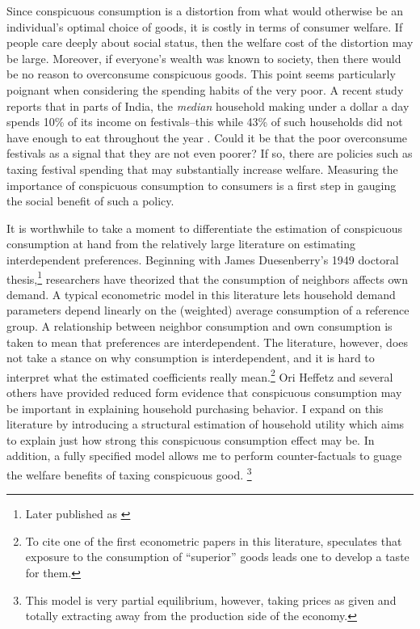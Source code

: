 \documentclass{article}
\begin{document}
Since conspicuous consumption is a distortion from what would otherwise be an individual's optimal choice of goods, it is costly in terms of consumer welfare.  If people care deeply about social status, then the welfare cost of the distortion may be large.  Moreover, if everyone's wealth was known to society, then there would be no reason to overconsume conspicuous goods.  This point seems particularly poignant when considering the spending habits of the very poor.  A recent study reports that in parts of India, the \emph{median} household making under a dollar a day spends 10\% of its income on festivals--this while 43\% of such households did not have enough to eat throughout the year \citep{BanerjeeDuflo2007}.  Could it be that the poor overconsume festivals as a signal that they are not even poorer?  If so, there are policies such as taxing festival spending that may substantially increase welfare.  Measuring the importance of conspicuous consumption to consumers is a first step in gauging the social benefit of such a policy.

It is worthwhile to take a moment to differentiate the estimation of conspicuous consumption at hand from the relatively large literature on estimating interdependent preferences.  Beginning with James Duesenberry's 1949 doctoral thesis,\footnote{Later published as \citep{Duesenberry1949}} researchers have theorized that the consumption of neighbors affects own demand.  A typical econometric model in this literature lets household demand parameters depend linearly on the (weighted) average consumption of a reference group. A relationship between neighbor consumption and own consumption is taken to mean that preferences are interdependent.  The literature, however, does not take a stance on why consumption is interdependent, and it is hard to interpret what the estimated coefficients really mean.\footnote{To cite one of the first econometric papers in this literature, \citet{Pollak1976} speculates that exposure to the consumption of ``superior'' goods leads one to develop a taste for them.}  
Ori Heffetz and several others have provided reduced form evidence that conspicuous consumption may be important in explaining household purchasing behavior.
I expand on this literature by introducing a structural estimation of household utility which aims to explain just how strong this conspicuous consumption effect may be.
In addition, a fully specified model allows me to perform counter-factuals to guage the welfare benefits of taxing conspicuous good.
\footnote{This model is very partial equilibrium, however, taking prices as given and totally extracting away from the production side of the economy.}
\end{document}
